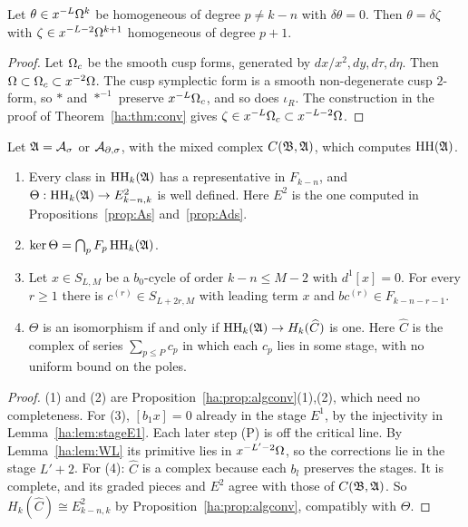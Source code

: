 \begin{lemma}\label{ha:lem:WL}
Let \(\theta\in x^{-L}\Omega^k\) be homogeneous of degree \(p\ne k-n\) with
\(\delta\theta=0\). Then \(\theta=\delta\zeta\) with \(\zeta\in
x^{-L-2}\Omega^{k+1}\) homogeneous of degree \(p+1\).
\end{lemma}

\begin{proof}
Let \(\Omega_c\) be the smooth cusp forms, generated by \(dx/x^2,dy,d\tau,
d\eta\). Then \(\Omega\subset\Omega_c\subset x^{-2}\Omega\). The cusp symplectic form
is a smooth non-degenerate cusp \(2\)-form, so \(*\) and \(*^{-1}\) preserve
\(x^{-L}\Omega_c\), and so does \(\iota_R\). The construction in the proof of
Theorem~\ref{ha:thm:conv} gives \(\zeta\in x^{-L}\Omega_c\subset
x^{-L-2}\Omega\).
\end{proof}

\begin{proposition}
\label{ha:prop:laurent}
Let \(\mathfrak A=\mathcal A_\sigma\) or \(\mathcal A_{\partial,\sigma}\), with the mixed complex
\(C(\mathfrak B,\mathfrak A)\), which computes \(\operatorname{HH}(\mathfrak A)\).
\begin{enumerate}
\item Every class in \(\operatorname{HH}_k(\mathfrak A)\) has a representative in
\(F_{k-n}\), and \(\Theta:\operatorname{HH}_k(\mathfrak A)\to E^2_{k-n,k}\) is well defined.
Here \(E^2\) is the one computed in Propositions~\ref{prop:As}
and~\ref{prop:Ads}.
\item \(\ker\Theta=\bigcap_pF_p\operatorname{HH}_k(\mathfrak A)\).
\item Let \(x\in S_{L,M}\) be a \(b_0\)-cycle of order \(k-n\le M-2\)
with \(d^1[x]=0\). For every \(r\ge1\) there is \(c^{(r)}\in
S_{L+2r,M}\) with leading term \(x\) and \(bc^{(r)}\in F_{k-n-r-1}\).
\item \(\Theta\) is an isomorphism if and only if \(\operatorname{HH}_k(\mathfrak A)\to
H_k(\widehat C)\) is one. Here \(\widehat C\) is the complex of series
\(\sum_{p\le P}c_p\) in which each \(c_p\) lies in some stage, with no
uniform bound on the poles.
\end{enumerate}
\end{proposition}

\begin{proof}
(1) and (2) are Proposition~\ref{ha:prop:algconv}(1),(2), which need no
completeness. For (3), \([b_1x]=0\) already in the stage \(E^1\), by the
injectivity in Lemma~\ref{ha:lem:stageE1}. Each later step (P) is off the
critical line. By Lemma~\ref{ha:lem:WL} its primitive lies in
\(x^{-L'-2}\Omega\), so the corrections lie in the stage \(L'+2\). For (4):
\(\widehat C\) is a complex because each \(b_l\) preserves the stages. It
is complete, and its graded pieces and \(E^2\) agree with those of
\(C(\mathfrak B,\mathfrak A)\). So \(H_k(\widehat C)\cong E^2_{k-n,k}\) by
Proposition~\ref{ha:prop:algconv}, compatibly with \(\Theta\).
\end{proof}


